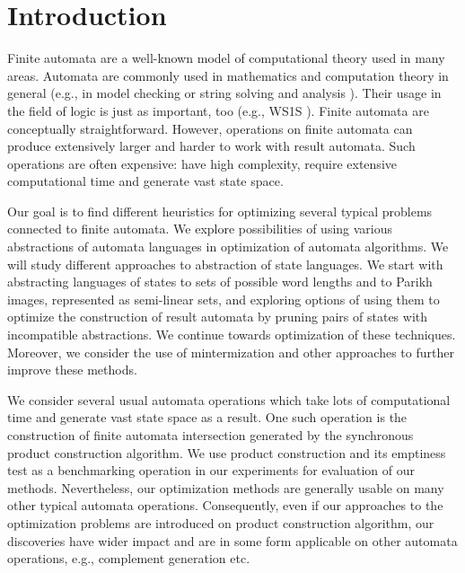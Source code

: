 \chapter{Introduction}


Finite automata are a well-known model of computational theory used in many areas. Automata are commonly used in mathematics and computation theory in general (e.g., in model checking \cite{DBLP:conf/cav/SiegelY20} or string solving and analysis \cite{DBLP:conf/popl/LinB16}). Their usage in the field of logic is just as important, too (e.g., WS1S \cite{DBLP:conf/tacas/FiedorHJLV17, DBLP:journals/acta/FiedorHLV19}). Finite automata are conceptually straightforward. However, operations on finite automata can produce extensively larger and harder to work with result automata. Such operations are often expensive: have high complexity, require extensive computational time and generate vast state space.

Our goal is to find different heuristics for optimizing several typical problems connected to finite automata. We explore possibilities of using various abstractions of automata languages in optimization of automata algorithms. We will study different approaches to abstraction of state languages. We start with abstracting languages of states to sets of possible word lengths and to Parikh images, represented as semi-linear sets, and exploring options of using them to optimize the construction of result automata by pruning pairs of states with incompatible abstractions. We continue towards optimization of these techniques. Moreover, we consider the use of mintermization and other approaches to further improve these methods.

We consider several usual automata operations which take lots of computational time and generate vast state space as a result. One such operation is the construction of finite automata intersection generated by the synchronous product construction algorithm. We use product construction and its emptiness test as a benchmarking operation in our experiments for evaluation of our methods. Nevertheless, our optimization methods are generally usable on many other typical automata operations. Consequently, even if our approaches to the optimization problems are introduced on product construction algorithm, our discoveries have wider impact and are in some form applicable on other automata operations, e.g., complement generation etc.

